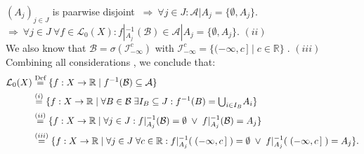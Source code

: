 \documentclass{article}
\begin{document}
$(A_j)_{j\in J}$ is paarwise disjoint $\ \Rightarrow \  \forall j\in J: \mathcal{A}|A_j = \{ \emptyset, A_j \}$.\\
$\Rightarrow \ \forall j \in J\  \forall f \in \mathcal{L}_0(X):  f|_{A_j}^{-1}(\mathcal{B}) \in \mathcal{A}|A_j = \{ \emptyset, A_j \}  $. \hspace{6.5cm} $(ii)$\\
We also know that $\mathcal{B} = \sigma(\mathcal{I}_{-\infty}^c)$ with $\mathcal{I}_{-\infty}^c =  \{ (-\infty, c \,] \;| \; c\in \mathbb{R}  \}\;$. \hspace{4.4cm} $(iii)$\\
Combining all considerations , we conclude that: \vspace*{-0.5em}
\begin{align}
\noindent \notag \mathcal{L}_0(X) &\overset{\text{Def}}{=} \{ f:X \rightarrow \mathbb{R} \; | \; f^{-1}(\mathcal{B}) \subseteq \mathcal{A} \}\\
\notag & \overset{ (i) }{=} \{ f:X \rightarrow \mathbb{R} \; | \; \forall B \in \mathcal{B} \;\exists I_B \subseteq J:  f^{-1}(B) = \textstyle{\bigcup_{i \in I_B} } A_i \}\\
\notag & \overset{ (ii) }{=} \{ f:X \rightarrow \mathbb{R} \; | \; \forall j \in J : f|_{A_j}^{-1}(\mathcal{B}) = \emptyset \; \lor \;  f|_{A_j}^{-1}(\mathcal{B}) = A_j \}\\
\notag & \overset{ (iii) }{=} \{ f:X \rightarrow \mathbb{R} \; | \; \forall j \in J \; \forall c\in \mathbb{R} : f|_{A_j}^{-1}(\; (-\infty, c\, ]  \;) = \emptyset \; \lor \;  f|_{A_j}^{-1}(\; (-\infty, c\, ]  \;) = A_j \}.\\
\notag 
\end{align}
\end{document}
